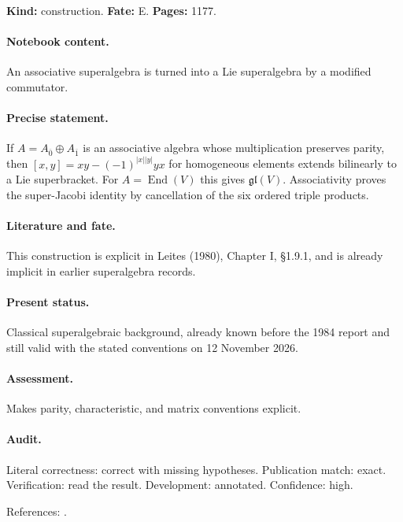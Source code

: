 \label{item:1983-626.3}

\noindent\textbf{Kind:} construction. \textbf{Fate:} E. \textbf{Pages:} 1177.\par

\paragraph{Notebook content.} An associative superalgebra is turned into a Lie superalgebra by a modified commutator.

\paragraph{Precise statement.} If \(A=A_{\overline0}\oplus A_{\overline1}\) is an associative algebra whose multiplication preserves parity, then \([x,y]=xy-(-1)^{|x||y|}yx\) for homogeneous elements extends bilinearly to a Lie superbracket. For \(A=\operatorname{End}(V)\) this gives \(\mathfrak{gl}(V)\). Associativity proves the super-Jacobi identity by cancellation of the six ordered triple products.

\paragraph{Literature and fate.} This construction is explicit in Leites (1980), Chapter I, \S1.9.1, and is already implicit in earlier superalgebra records.

\paragraph{Present status.} Classical superalgebraic background, already known before the 1984 report and still valid with the stated conventions on 12 November 2026.

\paragraph{Assessment.} Makes parity, characteristic, and matrix conventions explicit.

\paragraph{Audit.} Literal correctness: correct with missing hypotheses. Publication match: exact. Verification: read the result. Development: annotated. Confidence: high.

\noindent References: \citep{leites1980introduction}.\par

